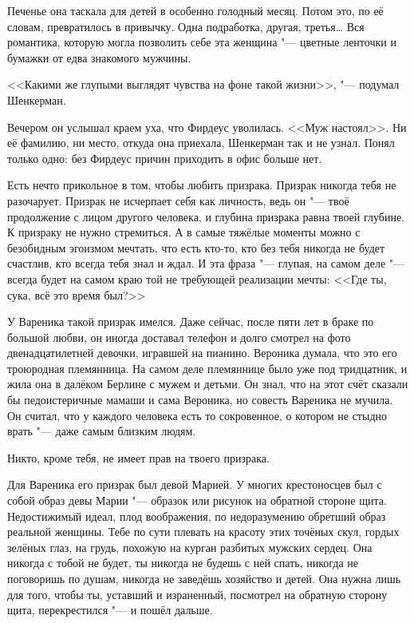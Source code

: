 Печенье она таскала для детей в особенно голодный месяц.
Потом это, по её словам, превратилось в привычку.
Одна подработка, другая, третья\ldots{}
Вся романтика, которую могла позволить себе эта женщина "--- цветные ленточки и бумажки от едва знакомого мужчины.

<<Какими же глупыми выглядят чувства на фоне такой жизни>>, "--- подумал Шенкерман.

Вечером он услышал краем уха, что Фирдеус уволилась.
<<Муж настоял>>.
Ни её фамилию, ни место, откуда она приехала, Шенкерман так и не узнал.
Понял только одно: без Фирдеус причин приходить в офис больше нет.

\asterism

Есть нечто прикольное в том, чтобы любить призрака.
Призрак никогда тебя не разочарует.
Призрак не исчерпает себя как личность, ведь он "--- твоё продолжение с лицом другого человека, и глубина призрака равна твоей глубине.
К призраку не нужно стремиться.
А в самые тяжёлые моменты можно с безобидным эгоизмом мечтать, что есть кто-то, кто без тебя никогда не будет счастлив, кто всегда тебя знал и ждал.
И эта фраза "--- глупая, на самом деле "--- всегда будет на самом краю той не требующей реализации мечты:
<<Где ты, сука, всё это время был?>>

У Вареника такой призрак имелся.
Даже сейчас, после пяти лет в браке по большой любви, он иногда доставал телефон и долго смотрел на фото двенадцатилетней девочки, игравшей на пианино.
Вероника думала, что это его троюродная племянница.
На самом деле племяннице было уже под тридцатник, и жила она в далёком Берлине с мужем и детьми.
Он знал, что на этот счёт сказали бы педоистеричные мамаши и сама Вероника, но совесть Вареника не мучила.
Он считал, что у каждого человека есть то сокровенное, о котором не стыдно врать "--- даже самым близким людям.

Никто, кроме тебя, не имеет прав на твоего призрака.

Для Вареника его призрак был девой Марией.
У многих крестоносцев был с собой образ девы Марии "--- образок или рисунок на обратной стороне щита.
Недостижимый идеал, плод воображения, по недоразумению обретший образ реальной женщины.
Тебе по сути плевать на красоту этих точёных скул, гордых зелёных глаз, на грудь, похожую на курган разбитых мужских сердец.
Она никогда с тобой не будет, ты никогда не будешь с ней спать, никогда не поговоришь по душам, никогда не заведёшь хозяйство и детей.
Она нужна лишь для того, чтобы ты, уставший и израненный, посмотрел на обратную сторону щита, перекрестился "--- и пошёл дальше.

